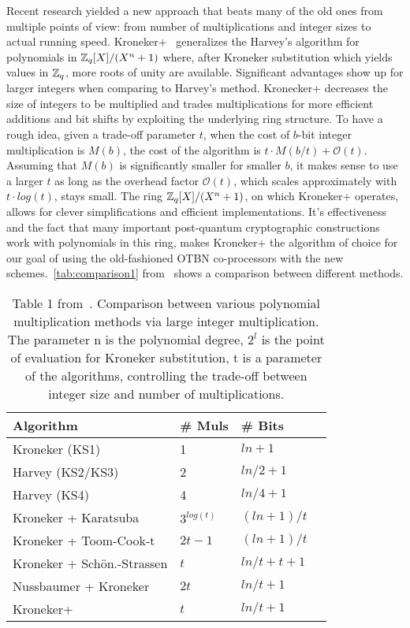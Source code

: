 Recent research yielded a new approach that beats many of the old ones from multiple points of view: from number of multiplications and integer sizes to actual running speed. Kroneker+~\parencite{cryptoeprint:2020/1303} generalizes the Harvey's algorithm for polynomials in $\mathbb{Z}_q[X]/(X^n + 1)$ where, after Kroneker substitution which yields values in $\mathbb{Z}_q$, more roots of unity are available.  Significant advantages show up for larger integers when comparing to Harvey's method. Kronecker+ decreases the size of integers to be multiplied and trades multiplications for more efficient additions and bit shifts by exploiting the underlying ring structure. To have a rough idea, given a trade-off parameter $t$, when the cost of $b$-bit integer multiplication is $M(b)$, the cost of the algorithm is $t \cdot M(b / t) + \mathcal{O}(t)$. Assuming that $M(b)$ is significantly smaller for smaller $b$, it makes sense to use a larger $t$ as long as the overhead factor $\mathcal{O}(t)$, which scales approximately with $t \cdot log(t)$, stays small. The ring $\mathbb{Z}_q[X]/(X^n + 1)$, on which Kroneker+ operates, allows for clever simplifications and efficient implementations. It's effectiveness and the fact that many important post-quantum cryptographic constructions work with polynomials in this ring, makes Kroneker+ the algorithm of choice for our goal of using the old-fashioned OTBN co-processors with the new schemes.~\autoref{tab:comparison1} from~\parencite{cryptoeprint:2020/1303} shows a comparison between different methods.



\begin{table}[htpb]
  \caption[]{Table 1 from~\parencite{cryptoeprint:2020/1303}. Comparison between various polynomial multiplication methods via large integer multiplication. The parameter n is the polynomial degree, $2^l$ is the point of evaluation for Kroneker substitution, t is a parameter of the algorithms, controlling the trade-off between integer size and number of multiplications.}\label{tab:comparison1}
  \centering
  \begin{tabular}{l l l l}
    \toprule
      Algorithm & \# Muls & \# Bits\\
    \midrule
      Kroneker (KS1) & 1 & $ln + 1$ \\
      Harvey (KS2/KS3) & 2 & $ln / 2 + 1$ \\
      Harvey (KS4) & 4 & $ln / 4 + 1$ \\
      Kroneker + Karatsuba & $3^{log(t)}$ & $(ln + 1) / t$ \\
      Kroneker + Toom-Cook-t & $2t - 1$ & $ (ln + 1) / t$ \\
      Kroneker + Schön.-Strassen & $t$ & $ln / t + t + 1$ \\
      Nussbaumer + Kroneker & $2t$ & $ln/t + 1$ \\
      Kroneker+ & $t$ & $ln/t + 1$ \\
    \bottomrule
  \end{tabular}
\end{table}

